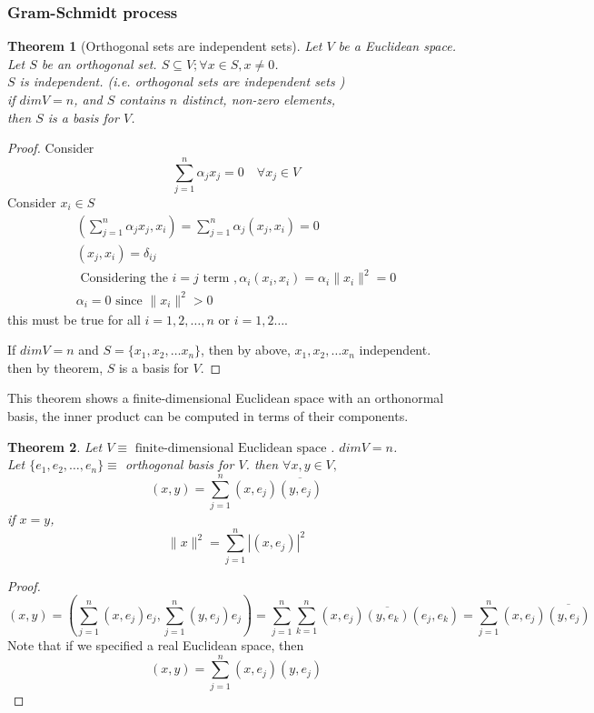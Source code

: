 \documentclass[twoside]{amsart}
\theoremstyle{plain}
\newtheorem{theorem}{Theorem}
\theoremstyle{definition}
\begin{document}
\subsubsection{Gram-Schmidt process}
\begin{theorem}[Orthogonal sets are independent sets]
  Let $V$ be a Euclidean space. \\  
  Let $S$ be an orthogonal set.  $S \subseteq V; \forall x \in S, x\neq 0$.  \\
  $S$ is independent.  (i.e. orthogonal sets are independent sets ) \\

if $dim V= n$, and $S$ contains $n$ distinct, non-zero elements, \\
\phantom{if} then $S$ is a basis for $V$.  
\end{theorem}
\begin{proof}
  Consider
  \[
  \sum_{j=1}^n \alpha_j x_j = 0 \quad \forall x_j \in V
  \]
  Consider $x_i \in S$
  \begin{gather*}
  \left( \sum_{j=1}^n \alpha_j x_j, x_i \right) = \sum_{j=1}^n \alpha_j(x_j, x_i) = 0 \\
  (x_j,x_i) = \delta_{ij} \\
  \text{ Considering the $i=j$ term }, \alpha_i(x_i, x_i) = \alpha_i \| x_i \|^2 = 0 \\
  \alpha_i  =0 \text{ since } \| x_i \|^2 > 0
  \end{gather*}
this must be true for all $i=1,2, \dots , n$ or $i=1,2 \dots $.  

If $dim V= n $ and $S = \{ x_1, x_2, \dots x_n \} $, then by above, $x_1, x_2, \dots x_n$ independent.  \\
\phantom{if} then by theorem, $S$ is a basis for $V$.  
  \end{proof}

This theorem shows a finite-dimensional Euclidean space with an orthonormal basis, the inner product can be computed in terms of their components.  
\begin{theorem}
  Let $V \equiv \text{ finite-dimensional Euclidean space }$.  $dim V= n$.  \\
  Let $\{ e_1, e_2, \dots , e_n \} \equiv $ orthogonal basis for $V$.  
  then $\forall x, y \in V,$
  \[
  (x,y) = \sum_{j=1}^n (x,e_j)\overline{ (y,e_j) }
  \]
  if $x=y$,
  \[
  \| x \|^2 = \sum_{j=1}^n | (x,e_j) |^2 
  \]
\end{theorem}
\begin{proof}
\[
(x,y) = \left( \sum_{j=1}^n (x,e_j)e_j, \sum_{j=1}^n (y,e_j) e_j \right) = \sum_{j=1}^n \sum_{k=1}^n (x,e_j) \overline{ (y,e_k) } (e_j,e_k) = \sum_{j=1}^n (x,e_j) \overline{ (y,e_j) }
\]
Note that if we specified a real Euclidean space, then 
\[
(x,y) = \sum_{j=1}^n (x,e_j)(y, e_j)
\]
\end{proof}
\end{document}
